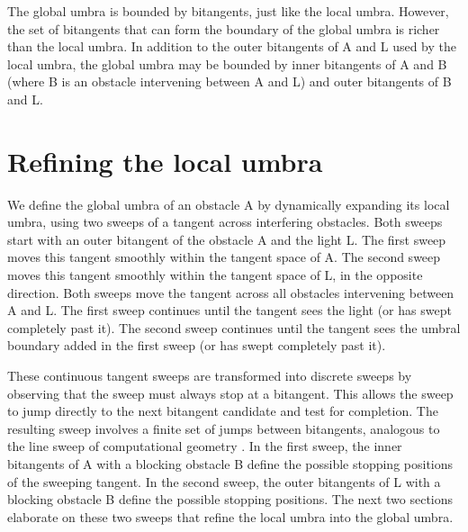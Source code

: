 \documentclass[9pt]{article}
\begin{document}
The global umbra is bounded by bitangents, just like the local umbra.
However, the set of bitangents that can form the 
boundary of the global umbra is richer than the local umbra.
In addition to the outer bitangents of A and L used by the
local umbra, the global umbra may be bounded by inner bitangents of A and B
(where B is an obstacle intervening between A and L)
and outer bitangents of B and L.



\section{Refining the local umbra}

We define the global umbra of an obstacle A by dynamically expanding its local umbra,
using two sweeps of a tangent across interfering obstacles.
Both sweeps start with an outer bitangent of the obstacle A and the light L.
The first sweep moves this tangent smoothly within the tangent space of A.
The second sweep moves this tangent smoothly within the tangent space of L,
in the opposite direction.
Both sweeps move the tangent across all obstacles intervening between A and L.
The first sweep continues until the tangent sees the light (or has swept
completely past it).
The second sweep continues until the tangent sees the umbral boundary added
in the first sweep (or has swept completely past it).

These continuous tangent sweeps are transformed into discrete sweeps
by observing that the sweep must always stop at a bitangent.
This allows the sweep to jump directly to the next bitangent candidate
and test for completion.
The resulting sweep involves a finite set of jumps between bitangents,
analogous to the line sweep of computational geometry \cite{preparataShamos}.
In the first sweep,
the inner bitangents of A with a blocking obstacle B define the possible
stopping positions of the sweeping tangent.
In the second sweep, the outer bitangents of L with a blocking obstacle B
define the possible stopping positions.
The next two sections elaborate on these two sweeps that refine
the local umbra into the global umbra.
\end{document}
